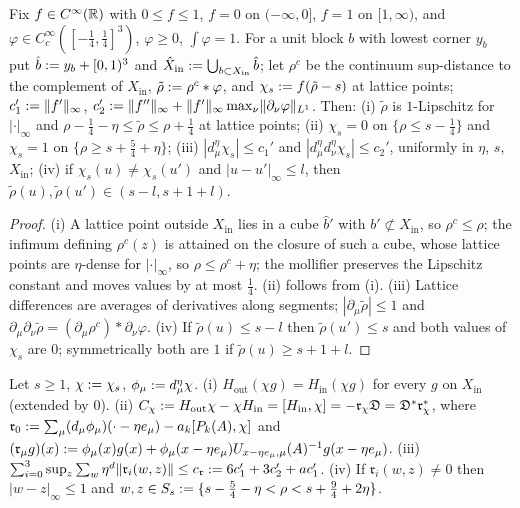 \begin{lemma}[collars]\label{sup1:lem:S21}
Fix $f\in C^\infty(\mathbb R)$ with $0\le f\le1$, $f=0$ on $(-\infty,0]$, $f=1$ on $[1,\infty)$, and $\varphi\in C^\infty_c([-\frac14,\frac14]^3)$, $\varphi\ge0$, $\int\varphi=1$. For a unit block $b$ with lowest corner $y_b$ put $\hat b:= y_b+[0,1)^3$ and $\hat X_{\mathrm{in}}:=\bigcup_{b\subset X_{\mathrm{in}}}\hat b$; let $\rho^c$ be the continuum sup-distance to the complement of $\hat X_{\mathrm{in}}$, $\tilde\rho:=\rho^c*\varphi$, and $\chi_s:= f(\tilde\rho-s)$ at lattice points; $c_1':=\lVert f'\rVert_\infty$, $c_2':=\lVert f''\rVert_\infty+\lVert f'\rVert_\infty\max_\nu\lVert \partial_\nu\varphi\rVert_{L^1}$. Then: \textup{(i)} $\tilde\rho$ is $1$-Lipschitz for $|\cdot|_\infty$ and $\rho-\frac14-\eta\le\tilde\rho\le\rho+\frac14$ at lattice points; \textup{(ii)} $\chi_s=0$ on $\{\rho\le s-\frac14\}$ and $\chi_s=1$ on $\{\rho\ge s+\frac54+\eta\}$; \textup{(iii)} $|d^\eta_\mu\chi_s|\le c_1'$ and $|d^\eta_\mu d^\eta_\nu\chi_s|\le c_2'$, uniformly in $\eta$, $s$, $X_{\mathrm{in}}$; \textup{(iv)} if $\chi_s(u)\ne\chi_s(u')$ and $|u-u'|_\infty\le l$, then $\tilde\rho(u),\tilde\rho(u')\in(s-l,s+1+l)$.
\end{lemma}

\begin{proof}
(i) A lattice point outside $X_{\mathrm{in}}$ lies in a cube $\hat b'$ with $b'\not\subset X_{\mathrm{in}}$, so $\rho^c\le\rho$; the infimum defining $\rho^c(z)$ is attained on the closure of such a cube, whose lattice points are $\eta$-dense for $|\cdot|_\infty$, so $\rho\le\rho^c+\eta$; the mollifier preserves the Lipschitz constant and moves values by at most $\frac14$. (ii) follows from (i). (iii) Lattice differences are averages of derivatives along segments; $|\partial_\mu\tilde\rho|\le1$ and $\partial_\mu\partial_\nu\tilde\rho=(\partial_\mu\rho^c)*\partial_\nu\varphi$. (iv) If $\tilde\rho(u)\le s-l$ then $\tilde\rho(u')\le s$ and both values of $\chi_s$ are $0$; symmetrically both are $1$ if $\tilde\rho(u)\ge s+1+l$.
\end{proof}

\begin{lemma}[commutators]\label{sup1:lem:S22}
Let $s\ge1$, $\chi:=\chi_s$, $\phi_\mu:= d^\eta_\mu\chi$. \textup{(i)} $H_{\mathrm{out}}(\chi g)=H_{\mathrm{in}}(\chi g)$ for every $g$ on $X_{\mathrm{in}}$ (extended by $0$). \textup{(ii)} $C_\chi:= H_{\mathrm{out}}\chi-\chi H_{\mathrm{in}}=[H_{\mathrm{in}},\chi]=-\mathfrak r_\chi\mathfrak D=\mathfrak D^*\mathfrak r_\chi^*$, where $\mathfrak r_0:=\sum_\mu(d_\mu\phi_\mu)(\cdot-\eta e_\mu)-a_k[P_k(A),\chi]$ and $(\mathfrak r_\mu g)(x):=\phi_\mu(x)g(x)+\phi_\mu(x-\eta e_\mu)U_{x-\eta e_\mu,\mu}(A)^{-1}g(x-\eta e_\mu)$. \textup{(iii)} $\sum_{i=0}^3\sup_z\sum_w\eta^d\lVert \mathfrak r_i(w,z)\rVert\le c_{\mathfrak r}:=6c_1'+3c_2'+ac_1'$. \textup{(iv)} If $\mathfrak r_i(w,z)\ne0$ then $|w-z|_\infty\le1$ and $w,z\in S_s:=\{s-\frac54-\eta<\rho<s+\frac94+2\eta\}$.
\end{lemma}


